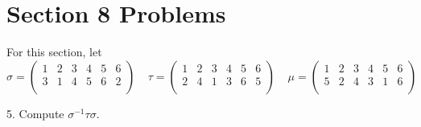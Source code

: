 \documentclass{article}
\begin{document}
\section*{Section 8 Problems}
For this section, let 
\[\sigma  = \begin{pmatrix}
    1 & 2 & 3 & 4 & 5 & 6\\
    3 & 1 & 4 & 5 & 6 & 2\\
\end{pmatrix} \:\:\:\:\: 
\tau = \begin{pmatrix}
    1 & 2 & 3 & 4 & 5 & 6\\
    2 & 4 & 1 & 3 & 6 & 5\\
\end{pmatrix} \:\:\:\:\:
\mu = \begin{pmatrix}
    1 & 2 & 3 & 4 & 5 & 6\\
    5 & 2 & 4 & 3 & 1 & 6\\
    
\end{pmatrix}\]

5. Compute $\sigma^{-1} \tau \sigma$.
\end{document}
